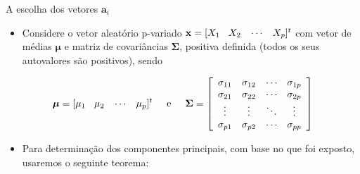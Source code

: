 \documentclass[
  ignorenonframetext,
  aspectratio=169,
]{beamer}
\providecommand{\tightlist}{%
  \setlength{\itemsep}{0pt}\setlength{\parskip}{0pt}}
\begin{document}
\begin{frame}{A escolha dos vetores \(\boldsymbol{a}_i\)}
\label{a-escolha-dos-vetores-boldsymbola_i}
\begin{itemize}
\tightlist
\item
  Considere o vetor aleatório p-variado
  \(\mathbf{x} = [X_1 \hspace{0.3cm} X_2 \hspace{0.3cm} \cdots \hspace{0.3cm} X_p]^t\)
  com vetor de médias \(\boldsymbol{\mu}\) e matriz de covariâncias
  \(\boldsymbol{\Sigma}\), positiva definida (todos os seus autovalores
  são positivos), sendo
\end{itemize}

\[\boldsymbol{\mu} = [\mu_1 \hspace{0.3cm} \mu_2 \hspace{0.3cm} \cdots \hspace{0.3cm} \mu_p]^t \hspace{0.5cm} \textrm{e} \hspace{0.5cm}
\boldsymbol{\Sigma} = \left[ \begin{array}{cccc} \sigma_{11} & \sigma_{12} & \cdots & \sigma_{1p}
\\ \sigma_{21} & \sigma_{22} & \cdots & \sigma_{2p} 
\\ \vdots & \vdots & \ddots & \vdots
\\ \sigma_{p1} & \sigma_{p2} & \cdots & \sigma_{pp} \end{array} \right]\]

\pause

\begin{itemize}
\tightlist
\item
  Para determinação dos componentes principais, com base no que foi
  exposto, usaremos o seguinte teorema:
\end{itemize}
\end{frame}
\end{document}
